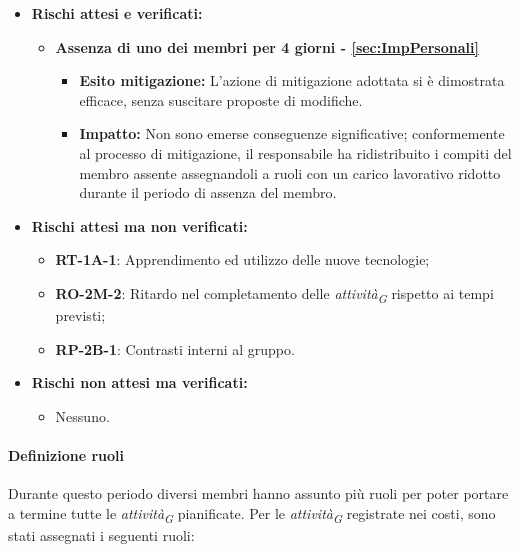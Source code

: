 \begin{itemize}
    \item \textbf{Rischi attesi e verificati:}
\begin{itemize}
    \item \textbf{Assenza di uno dei membri per 4 giorni - \ref{sec:ImpPersonali}}
    \begin{itemize}
        \item \textbf{Esito mitigazione:} 
        L'azione di mitigazione adottata si è dimostrata efficace, senza suscitare proposte di modifiche.
        \item \textbf{Impatto:}
        Non sono emerse conseguenze significative; conformemente al processo di mitigazione, il responsabile ha ridistribuito i compiti del membro assente assegnandoli a ruoli con un carico lavorativo ridotto durante il periodo di assenza del membro.
    \end{itemize}
\end{itemize}
\item \textbf{Rischi attesi ma non verificati:}
 \begin{itemize}
    \item \textbf{RT-1A-1}: Apprendimento ed utilizzo delle nuove tecnologie;
    \item \textbf{RO-2M-2}: Ritardo nel completamento delle \textit{attività}\textsubscript{\textit{G}} rispetto ai tempi previsti;
    \item \textbf{RP-2B-1}: Contrasti interni al gruppo.
\end{itemize}
\item \textbf{Rischi non attesi ma verificati:}
\begin{itemize}
    \item Nessuno.
\end{itemize}
\end{itemize}


\paragraph{Definizione ruoli}
Durante questo periodo diversi membri hanno assunto più ruoli per poter portare a termine tutte le \textit{attività}\textsubscript{\textit{G}} pianificate.
Per le \textit{attività}\textsubscript{\textit{G}} registrate nei costi, sono stati assegnati i seguenti ruoli:

